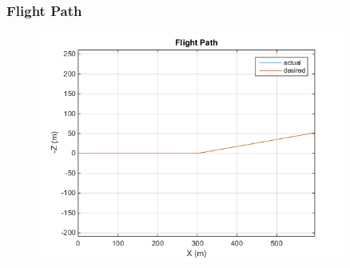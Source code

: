 \documentclass{beamer}
\begin{document}
    \begin{frame}
        \frametitle{Flight Path}
        \begin{figure}
            \centering
            \includegraphics[width=0.9\textwidth]{flight_path_optimal.png}
        \end{figure}
    \end{frame}
    
\end{document}
